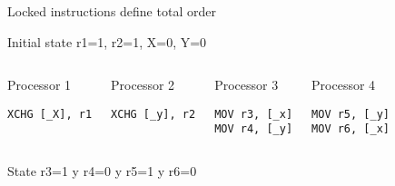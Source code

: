 \begin{frame}[t,fragile]{Locked instructions define total order}

\begin{block}{Initial state}
r1=1, r2=1, X=0, Y=0
\end{block}


\begin{columns}[T]


\begin{block}{\small Processor 1}
\begin{lstlisting}[language={[x86masm]Assembler}]
XCHG [_X], r1
\end{lstlisting}
\end{block}

\begin{block}{\small Processor 2}
\begin{lstlisting}[language={[x86masm]Assembler}]
XCHG [_y], r2
\end{lstlisting}
\end{block}

\begin{block}{\small Processor 3}
\begin{lstlisting}[language={[x86masm]Assembler}]
MOV r3, [_x]
MOV r4, [_y]
\end{lstlisting}
\end{block}

\begin{block}{\small Processor 4}
\begin{lstlisting}[language={[x86masm]Assembler}]
MOV r5, [_y]
MOV r6, [_x]
\end{lstlisting}
\end{block}

\end{columns}


\begin{block}{State }
r3=1 y r4=0 y r5=1 y r6=0
\end{block}

\end{frame}


